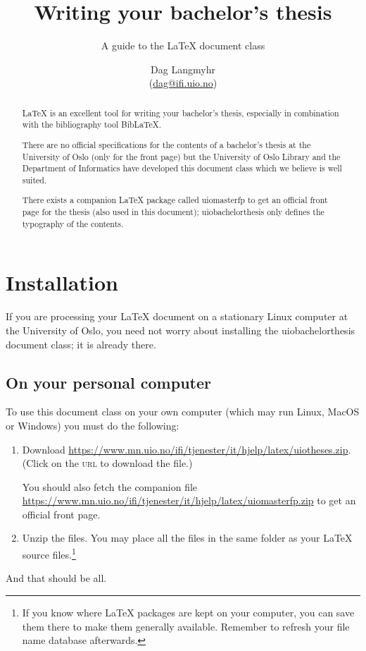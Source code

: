 \documentclass[UKenglish]{uiobachelorthesis}
\title{Writing your bachelor's thesis}
\subtitle{A guide to the \LaTeX{} document class \pb{uiobachelorthesis}}
\author{Dag Langmyhr\\ (\url{dag@ifi.uio.no})}
\newcommand{\p}[1]{\textsf{#1}}
\begin{document}
\uiomasterfp[kind=Documentation, compact, nosp, colour=grey, date=\today]

\begin{abstract}
  \LaTeX{} is an excellent tool for writing your bachelor's thesis, especially in
  combination with the bibliography tool Bib\LaTeX.

There are no official specifications for the contents of a bachelor's
thesis at the University of Oslo (only for the front page) but 
the University of Oslo Library
and the Department of Informatics have developed this document class
which we believe is well suited.

There exists a companion \LaTeX{} package called \p{uiomasterfp} to
get an official front page for the thesis (also used in this
document);
\p{uiobachelorthesis} only defines the typography of the contents.
\end{abstract}

\tableofcontents
 
\section{Installation}
If you are processing your \LaTeX{} document on a stationary Linux
computer at the University of Oslo, you need not worry about
installing the \p{uiobachelorthesis} document class; it is already there.

\subsection{On your personal computer\label{privat-pc}}
To use this document class on your own computer (which may run Linux, MacOS
or Windows) you must do the following:
\begin{enumerate}
\item Download
  \url{https://www.mn.uio.no/ifi/tjenester/it/hjelp/latex/uiotheses.zip}. (Click
  on the \textsc{url} to download the file.)

  You should also fetch the companion file
  \url{https://www.mn.uio.no/ifi/tjenester/it/hjelp/latex/uiomasterfp.zip}
  to get an official front page.
  
\item Unzip the files. You may place all the files in the same folder
  as your \LaTeX{} source files.\footnote{If you know where \LaTeX{}
    packages are kept on your computer, you 
    can save them there to make them generally available. Remember to
    refresh your file name database afterwards.}
\end{enumerate}
And that should be all.
\end{document}
